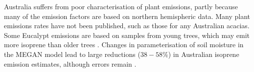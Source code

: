     
    Australia suffers from poor characterisation of plant emissions, partly because many of the emission factors are based on northern hemispheric data.
    Many plant emissions rates have not been published, such as those for any Australian acacias.
    Some Eucalypt emissions are based on samples from young trees, which may emit more isoprene than older trees \parencite{Emmerson2016}.
    Changes in parameterisation of soil moisture in the MEGAN model lead to large reductions ($38-58$\%) in Australian isoprene emission estimates, although errors remain \parencite{Sindelarova2014, Emmerson2019}.
    
